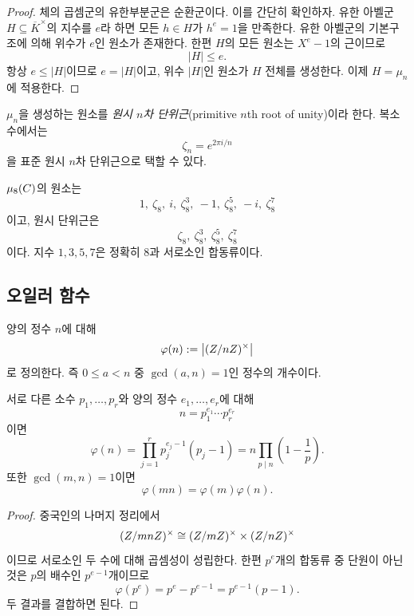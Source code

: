 \begin{proof}
체의 곱셈군의 유한부분군은 순환군이다. 이를 간단히 확인하자. 유한 아벨군 $H\subseteq\overline K^\times$의 지수를 $e$라 하면 모든 $h\in H$가 $h^e=1$을 만족한다. 유한 아벨군의 기본구조에 의해 위수가 $e$인 원소가 존재한다. 한편 $H$의 모든 원소는 $X^e-1$의 근이므로
\[
  |H|\le e.
\]
항상 $e\le|H|$이므로 $e=|H|$이고, 위수 $|H|$인 원소가 $H$ 전체를 생성한다. 이제 $H=\mu_n$에 적용한다.
\end{proof}

\begin{definition}[원시 단위근]
$\mu_n$을 생성하는 원소를 \emph{원시 $n$차 단위근}(primitive $n$th root of unity)이라 한다. 복소수에서는
\[
  \zeta_n=e^{2\pi i/n}
\]
을 표준 원시 $n$차 단위근으로 택할 수 있다.
\end{definition}

\begin{example}
$\mu_8(C)$의 원소는
\[
  1,\ \zeta_8,\ i,\ \zeta_8^3,\ -1,
  \ \zeta_8^5,\ -i,\ \zeta_8^7
\]
이고, 원시 단위근은
\[
  \zeta_8,\ \zeta_8^3,\ \zeta_8^5,\ \zeta_8^7
\]
이다. 지수 $1,3,5,7$은 정확히 $8$과 서로소인 합동류이다.
\end{example}

\subsection{오일러 함수}

\begin{definition}[오일러 함수]
양의 정수 $n$에 대해
\[
  \varphi(n):=\bigl|(Z/nZ)^\times\bigr|
\]
로 정의한다. 즉 $0\le a<n$ 중 $\gcd(a,n)=1$인 정수의 개수이다.
\end{definition}

\begin{proposition}
\label{prop:euler-totient-formula}
서로 다른 소수 $p_1,\dots,p_r$와 양의 정수 $e_1,\dots,e_r$에 대해
\[
  n=p_1^{e_1}\cdots p_r^{e_r}
\]
이면
\[
  \boxed{
  \varphi(n)
  =\prod_{j=1}^r p_j^{e_j-1}(p_j-1)
  =n\prod_{p\mid n}\left(1-\frac1p\right)}.
\]
또한 $\gcd(m,n)=1$이면
\[
  \varphi(mn)=\varphi(m)\varphi(n).
\]
\end{proposition}

\begin{proof}
중국인의 나머지 정리에서
\[
  (Z/mnZ)^\times
  \cong(Z/mZ)^\times\times(Z/nZ)^\times
\]
이므로 서로소인 두 수에 대해 곱셈성이 성립한다. 한편 $p^e$개의 합동류 중 단원이 아닌 것은 $p$의 배수인 $p^{e-1}$개이므로
\[
  \varphi(p^e)=p^e-p^{e-1}=p^{e-1}(p-1).
\]
두 결과를 결합하면 된다.
\end{proof}

